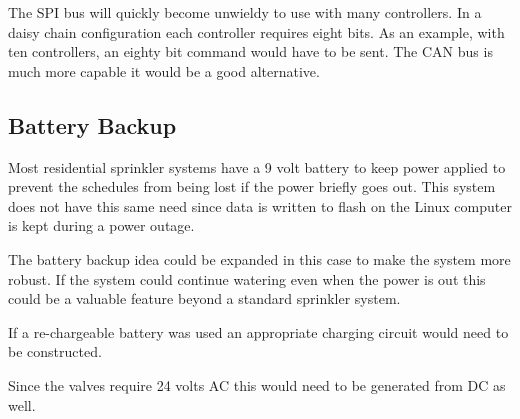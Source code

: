 \documentclass{article}
\begin{document}
The SPI bus will quickly become unwieldy to use with many controllers.
In a daisy chain configuration each controller requires eight bits.
As an example, with ten controllers, an eighty bit command
would have to be sent.
The CAN bus is much more capable it would be a good alternative.

\subsection{Battery Backup}

Most residential sprinkler systems have a 9 volt battery to keep power
applied to prevent the schedules from being lost if the power briefly goes out.
This system does not have this same need since data is written to flash
on the Linux computer is kept during a power outage.

The battery backup idea could be expanded in this case to make the
system more robust.
If the system could continue watering even when the power is out
this could be a valuable feature beyond a standard sprinkler system.

If a re-chargeable battery was used an appropriate charging circuit
would need to be constructed.

Since the valves require 24 volts AC this would need to be generated from
DC as well.


\pagebreak
\glsaddall
\printglossaries

\clearpage
\printbibliography[heading=bibintoc]
\end{document}
